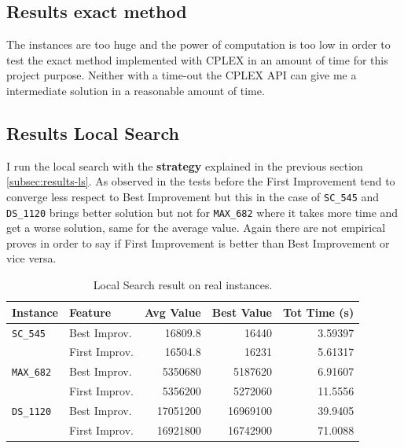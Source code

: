 	
	
	\subsection{Results exact method}
		The instances are too huge and the power of computation is too low in order to test the exact method implemented with CPLEX in an amount of time for this project purpose. Neither with a time-out the CPLEX API can give me a intermediate solution in a reasonable amount of time.
		
	
	\subsection{Results Local Search}
		I run the local search with the \textbf{strategy} explained in the previous section \ref{subsec:results-ls}. As observed in the tests before the First Improvement tend to converge less respect to Best Improvement but this in the case of \verb|SC_545| and \verb|DS_1120| brings better solution but not for \verb|MAX_682| where it takes more time and get a worse solution, same for the average value. Again there are not empirical proves in order to say if First Improvement is better than Best Improvement or vice versa.
		
		\begin{table}[h]
			\centering
			\begin{tabular}{llrrr}
				\toprule
				\textbf{Instance} & \textbf{Feature} & \textbf{Avg Value} & \textbf{Best Value} & \textbf{Tot Time (s)} \\
				\toprule
				\verb|SC_545|  & Best Improv. & 16809.8   & 16440            & 3.59397    \\
				& First Improv. & 16504.8   & 16231            & 5.61317    \\
				\midrule
				\verb|MAX_682| & Best Improv.  & 5350680   & 5187620          & 6.91607    \\
				& First Improv. & 5356200   & 5272060          & 11.5556    \\
				\midrule
				\verb|DS_1120| & Best Improv.  & 17051200   & 16969100      & 39.9405    \\
				& First Improv. & 16921800    & 16742900         & 71.0088   \\
				\bottomrule
			\end{tabular}
		\caption{Local Search result on real instances.}
		\label{fig:ri-results-ls}
		\end{table}
	
